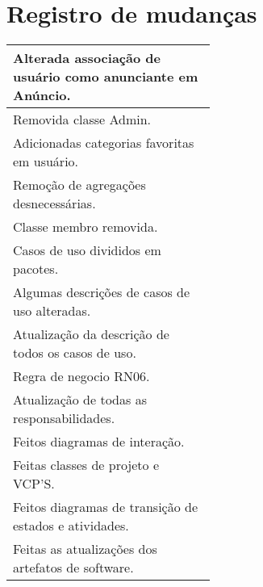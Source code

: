 \documentclass{article}
\begin{document}
\section{Registro de mudanças}

\begin{center}
 \begin{tabular}{|p{0.5\linewidth}|}
  \hline
  [12/10] Alterada associação de usuário como anunciante em Anúncio.\\ 
  \hline
  [12/10] Removida classe Admin.\\
  \hline
  [12/10] Adicionadas categorias favoritas em usuário.\\
  \hline
  [03/11] Remoção de agregações desnecessárias. \\
  \hline
  [03/11] Classe membro removida. \\
  \hline
  [03/11] Casos de uso divididos em pacotes. \\
  \hline
  [04/11] Algumas descrições de casos de uso alteradas. \\
  \hline
  [05/11] Atualização da descrição de todos os casos de uso. \\
  \hline
  [05/11] Regra de negocio RN06. \\
  \hline
  [05/11] Atualização de todas as responsabilidades. \\
  \hline
  [06/11] Feitos diagramas de interação. \\
  \hline
  [07/11] Feitas classes de projeto e VCP'S. \\
  \hline
  [04/12] Feitos diagramas de transição de estados e atividades. \\
  \hline
  [05/12] Feitas as atualizações dos artefatos de software. \\
  \hline
 \end{tabular} 
\end{center}
\end{document}
